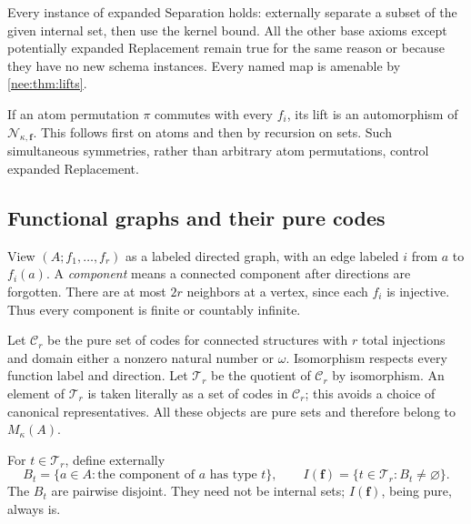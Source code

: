 \documentclass[11pt,letterpaper]{article}
\numberwithin{equation}{section}
\theoremstyle{plain}
\theoremstyle{definition}
\theoremstyle{remark}
\begin{document}
Every instance of expanded Separation holds: externally separate a subset of the given internal set, then use the kernel bound. All the other base axioms except potentially expanded Replacement remain true for the same reason or because they have no new schema instances. Every named map is amenable by \cref{nee:thm:lifts}.

If an atom permutation $\pi$ commutes with every $f_i$, its lift is an automorphism of $\mathcal N_{\kappa,\boldsymbol f}$. This follows first on atoms and then by recursion on sets. Such simultaneous symmetries, rather than arbitrary atom permutations, control expanded Replacement.

\subsection{Functional graphs and their pure codes}
View $(A;f_1,\ldots,f_r)$ as a labeled directed graph, with an edge labeled $i$ from $a$ to $f_i(a)$. A \emph{component} means a connected component after directions are forgotten. There are at most $2r$ neighbors at a vertex, since each $f_i$ is injective. Thus every component is finite or countably infinite.

Let $\mathcal C_r$ be the pure set of codes for connected structures with $r$ total injections and domain either a nonzero natural number or $\omega$. Isomorphism respects every function label and direction. Let $\mathcal T_r$ be the quotient of $\mathcal C_r$ by isomorphism. An element of $\mathcal T_r$ is taken literally as a set of codes in $\mathcal C_r$; this avoids a choice of canonical representatives. All these objects are pure sets and therefore belong to $M_\kappa(A)$.

For $t\in\mathcal T_r$, define externally
\begin{equation}\label{nee:eq:typeblocks}
B_t=\{a\in A:\text{the component of }a\text{ has type }t\},\qquad
I(\boldsymbol f)=\{t\in\mathcal T_r:B_t\neq\varnothing\}.
\end{equation}
The $B_t$ are pairwise disjoint. They need not be internal sets; $I(\boldsymbol f)$, being pure, always is.
\end{document}
